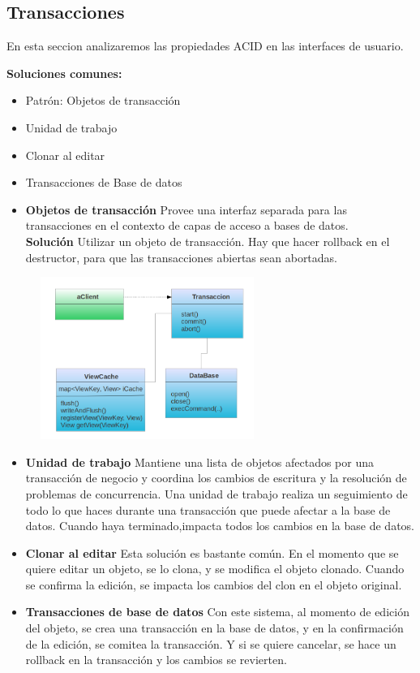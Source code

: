 \subsection{Transacciones}

En esta seccion analizaremos las propiedades ACID en las interfaces de usuario.


{\bf Soluciones comunes:}

\begin {itemize}

\item Patrón: Objetos de transacción
\item Unidad de trabajo
\item Clonar al editar
\item Transacciones de Base de datos 
\end {itemize}

\begin {itemize}

\item {\bf Objetos de transacción}
Provee una interfaz separada para las transacciones en el contexto de capas de
acceso a bases de datos.\\
{\bf Solución} Utilizar un objeto de transacción. Hay que hacer rollback en el
destructor, para que las transacciones abiertas sean abortadas.

\includegraphics[width=300px, height=200px]{img/objectTransaction}

\item {\bf Unidad de trabajo }
Mantiene una lista de objetos afectados por una transacción de negocio y
coordina los cambios de escritura y la resolución de problemas de concurrencia.
Una unidad de trabajo realiza un seguimiento de todo lo que haces durante una
transacción que puede afectar a la base de datos. 
Cuando haya terminado,impacta todos los cambios en la base de datos.

\item {\bf Clonar al editar}
Esta solución es bastante común. En el momento que se quiere editar un objeto,
se lo clona, y se modifica el objeto clonado. Cuando se confirma la edición, se
impacta los cambios del clon en el objeto original.

\item {\bf Transacciones de base de datos}
Con este sistema, al momento de edición del objeto, se crea una transacción en
la base de datos, y en la confirmación de la edición, se comitea la transacción.
Y si se quiere cancelar, se hace un rollback en la transacción y los cambios se
revierten.

\end {itemize}

